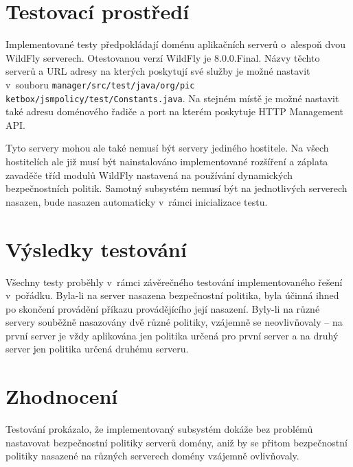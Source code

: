 \section{Testovací prostředí} %

Implementované testy předpokládají doménu aplikačních serverů o~alespoň dvou WildFly serverech. Otestovanou verzí WildFly je 8.0.0.Final.
Názvy těchto serverů a URL adresy na kterých poskytují své služby je možné nastavit v~souboru {\tt manager/src/test/java/org/pic ketbox/jsmpolicy/test/Constants.java}. Na stejném místě je možné nastavit také adresu doménového řadiče a port na kterém poskytuje HTTP Management API.

Tyto servery mohou ale také nemusí být servery jediného hostitele. Na všech hostitelích ale již musí být nainstalováno implementované rozšíření a záplata zavaděče tříd modulů WildFly nastavená na používání dynamických bezpečnostních politik. Samotný subsystém nemusí být na jednotlivých serverech nasazen, bude nasazen automaticky v~rámci inicializace testu.

\section{Výsledky testování}

Všechny testy proběhly v~rámci závěrečného testování implementovaného řešení v~pořádku.
Byla-li na server nasazena bezpečnostní politika, byla účinná ihned po skončení provádění příkazu provádějícího její nasazení.
Byly-li na různé servery souběžně nasazovány dvě různé politiky, vzájemně se neovlivňovaly -- na první server je vždy aplikována jen politika určená pro první server a na druhý server jen politika určená druhému serveru.

\section{Zhodnocení}

Testování prokázalo, že implementovaný subsystém dokáže bez problémů nastavovat bezpečnostní politiky serverů domény, aniž by se přitom bezpečnostní politiky nasazené na různých serverech domény vzájemně ovlivňovaly.

